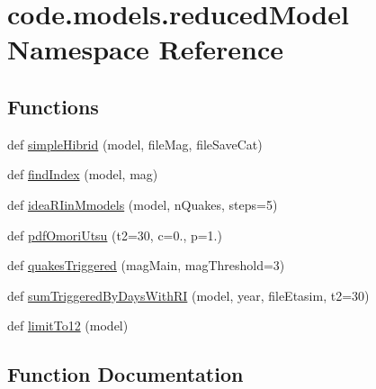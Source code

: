 \hypertarget{namespacecode_1_1models_1_1reduced_model}{}\section{code.\+models.\+reduced\+Model Namespace Reference}
\label{namespacecode_1_1models_1_1reduced_model}
\subsection*{Functions}
\begin{DoxyCompactItemize}
\item 
def \hyperlink{namespacecode_1_1models_1_1reduced_model_a43abc851d51b4127ff18ecf49274b7e8}{simple\+Hibrid} (model, file\+Mag, file\+Save\+Cat)
\item 
def \hyperlink{namespacecode_1_1models_1_1reduced_model_aea39822ffd73989d499ffba0a9dde2f1}{find\+Index} (model, mag)
\item 
def \hyperlink{namespacecode_1_1models_1_1reduced_model_a1dbc918061bcefc4e9955af387532b5f}{idea\+R\+Iin\+Mmodels} (model, n\+Quakes, steps=5)
\item 
def \hyperlink{namespacecode_1_1models_1_1reduced_model_adc35f87ac24a70566f1d6b6192e2e8c8}{pdf\+Omori\+Utsu} (t2=30, c=0., p=1.)
\item 
def \hyperlink{namespacecode_1_1models_1_1reduced_model_a7fdeffd40e64b70f475e1c244c8ff5e8}{quakes\+Triggered} (mag\+Main, mag\+Threshold=3)
\item 
def \hyperlink{namespacecode_1_1models_1_1reduced_model_a4a56ac6217f3091da455778217429040}{sum\+Triggered\+By\+Days\+With\+RI} (model, year, file\+Etasim, t2=30)
\item 
def \hyperlink{namespacecode_1_1models_1_1reduced_model_a15d2e8698086c4f6d8a6502cfd0f00c8}{limit\+To12} (model)
\end{DoxyCompactItemize}


\subsection{Function Documentation}
\mbox{\label{namespacecode_1_1models_1_1reduced_model_aea39822ffd73989d499ffba0a9dde2f1}} 
